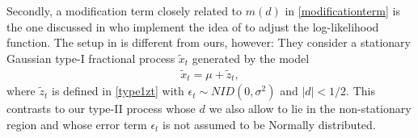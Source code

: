 {{Secondly, a modification term closely related to $m(d)$ in \eqref{modificationterm} is the one discussed in \textcite{an1993cox} who implement the idea of \textcite{cox1987parameter} to adjust the log-likelihood function.  The setup in
\textcite{an1993cox} is different from ours, however: They consider a stationary Gaussian type-I fractional process $\tilde{x}_t$ generated by the model
\begin{align}
    \tilde{x}_t = \mu + \tilde{z}_t, \label{type1model}
\end{align}
where $\tilde{z}_t$ is defined in \eqref{type1zt} with $\epsilon_t\sim \textit{NID}(0,\sigma^2)$ and $|d| < 1/2$. This contrasts to our type-II process whose $d$ we also allow to lie in the non-stationary region and whose error term
$\epsilon_t$ is not assumed to be Normally distributed.

}}
